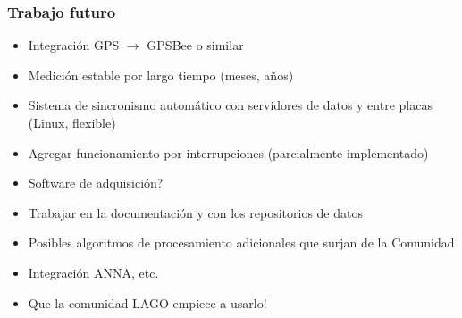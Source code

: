 \documentclass{beamer}
\begin{document}
\begin{frame}
	\frametitle{Trabajo futuro}
		\begin{exampleblock}{}
			\begin{itemize}
				\item Integración GPS $\to$ GPSBee o similar 
				\item Medición estable por largo tiempo (meses, años)
				\item Sistema de sincronismo automático con servidores de datos y entre
								placas (Linux, flexible)
				\item Agregar funcionamiento por interrupciones (parcialmente
								implementado)
				\item Software de adquisición?
				\item Trabajar en la documentación y con los repositorios de datos
				\item Posibles algoritmos de procesamiento adicionales que surjan de la
								Comunidad
				\item Integración ANNA, etc.
				\item \alert{Que la comunidad LAGO empiece a usarlo!}
			\end{itemize}
		\end{exampleblock}
\end{frame}
\end{document}
